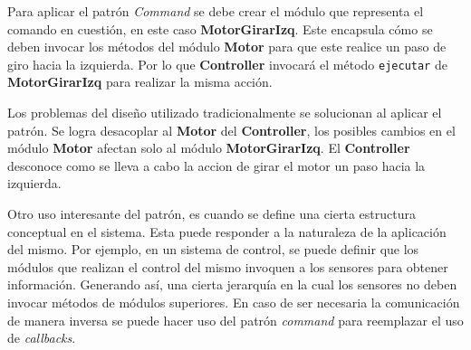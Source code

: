 Para aplicar el patrón \textit{Command} se debe crear el módulo que representa el comando en cuestión, en este caso \textbf{MotorGirarIzq}. Este encapsula cómo se deben invocar los métodos del módulo \textbf{Motor} para que este realice un paso de giro hacia la izquierda. Por lo que \textbf{Controller} invocará el método \verb|ejecutar| de \textbf{MotorGirarIzq} para realizar la misma acción.

Los problemas del diseño utilizado tradicionalmente se solucionan al aplicar el patrón. Se logra desacoplar al \textbf{Motor} del \textbf{Controller}, los posibles cambios en el módulo \textbf{Motor} afectan solo al módulo \textbf{MotorGirarIzq}. El \textbf{Controller} desconoce como se lleva a cabo la accion de girar el motor un paso hacia la izquierda.

Otro uso interesante del patrón, es cuando se define una cierta estructura conceptual en el sistema. Esta puede responder a la naturaleza de la aplicación del mismo. Por ejemplo, en un sistema de control, se puede definir que los módulos que realizan el control del mismo invoquen a los sensores para obtener información. Generando así, una cierta jerarquía en la cual los sensores no deben invocar métodos de módulos superiores. En caso de ser necesaria la comunicación de manera inversa se puede hacer uso del patrón \textit{command} para reemplazar el uso de \textit{callbacks}.


